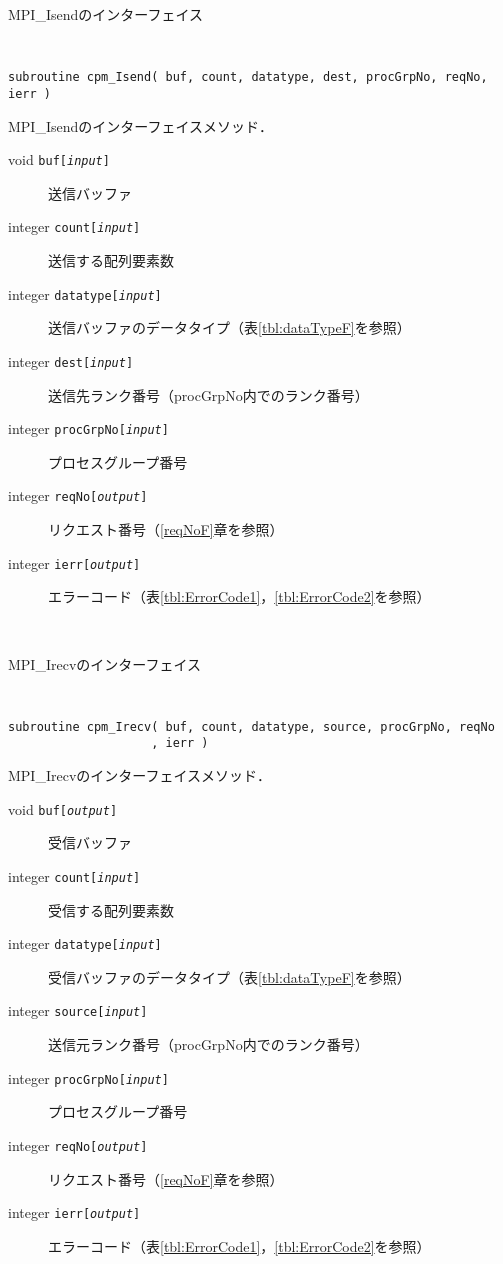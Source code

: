 \begin{spacing}{0.8}
\begin{itembox}[l]{MPI\_Isendのインターフェイス}
{\tt
\begin{verbatim}
subroutine cpm_Isend( buf, count, datatype, dest, procGrpNo, reqNo, ierr )
\end{verbatim}
}
MPI\_Isendのインターフェイスメソッド．
\begin{description}
\item[void    {\tt buf[{\it input}]}] 送信バッファ
\item[integer {\tt count[{\it input}]}] 送信する配列要素数
\item[integer {\tt datatype[{\it input}]}] 送信バッファのデータタイプ（表\ref{tbl:dataTypeF}を参照）
\item[integer {\tt dest[{\it input}]}] 送信先ランク番号（procGrpNo内でのランク番号）
\item[integer {\tt procGrpNo[{\it input}]}] プロセスグループ番号
\item[integer {\tt reqNo[{\it output}]}] リクエスト番号（\ref{reqNoF}章を参照）
\item[integer {\tt ierr[{\it output}]}] エラーコード（表\ref{tbl:ErrorCode1}，\ref{tbl:ErrorCode2}を参照）
\end{description}
\end{itembox}\\
\end{spacing}

\begin{spacing}{0.8}
\begin{itembox}[l]{MPI\_Irecvのインターフェイス}
{\tt
\begin{verbatim}
subroutine cpm_Irecv( buf, count, datatype, source, procGrpNo, reqNo
                    , ierr )
\end{verbatim}
}
MPI\_Irecvのインターフェイスメソッド．
\begin{description}
\item[void    {\tt buf[{\it output}]}] 受信バッファ
\item[integer {\tt count[{\it input}]}] 受信する配列要素数
\item[integer {\tt datatype[{\it input}]}] 受信バッファのデータタイプ（表\ref{tbl:dataTypeF}を参照）
\item[integer {\tt source[{\it input}]}] 送信元ランク番号（procGrpNo内でのランク番号）
\item[integer {\tt procGrpNo[{\it input}]}] プロセスグループ番号
\item[integer {\tt reqNo[{\it output}]}] リクエスト番号（\ref{reqNoF}章を参照）
\item[integer {\tt ierr[{\it output}]}] エラーコード（表\ref{tbl:ErrorCode1}，\ref{tbl:ErrorCode2}を参照）
\end{description}
\end{itembox}\\
\end{spacing}

